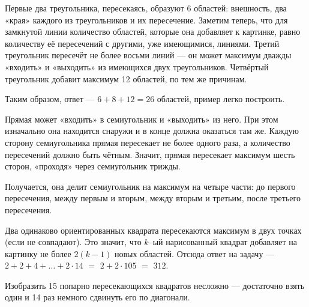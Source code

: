 \begin{itemize}

\itA Первые два треугольника, пересекаясь, образуют 6 областей: внешность, два «края» каждого из треугольников и их пересечение. Заметим теперь, что для замкнутой линии количество областей, которые она добавляет к картинке, равно количеству её пересечений с другими, уже имеющимися, линиями. Третий треугольник пересечёт не более восьми линий — он может максимум дважды «входить» и «выходить» из имеющихся двух треугольников. Четвёртый треугольник добавит максимум 12 областей, по тем же причинам.

Таким образом, ответ — $6+8+12=26$ областей, пример легко построить.

\itB Прямая может «входить» в семиугольник и «выходить» из него. При этом изначально она находится снаружи и в конце должна оказаться там же. Каждую сторону семиугольника прямая пересекает не более одного раза, а количество пересечений должно быть чётным. Значит, прямая пересекает максимум шесть сторон, «проходя» через семиугольник трижды.

Получается, она делит семиугольник на максимум на четыре части: до первого пересечения, между первым и вторым, между вторым и третьим, после третьего пересечения.

\itC Два одинаково ориентированных квадрата пересекаются максимум в двух точках (если не совпадают). Это значит, что $k$--ый нарисованный квадрат добавляет на картинку не более $2(k-1)$ новых областей. Отсюда ответ на задачу — $2+2+4+\ldots+2\cdot 14$ $=$ $2+2\cdot105$ $=$ $312$.

Изобразить 15 попарно пересекающихся квадратов несложно — достаточно взять один и 14 раз немного сдвинуть его по диагонали.
\end{itemize}
